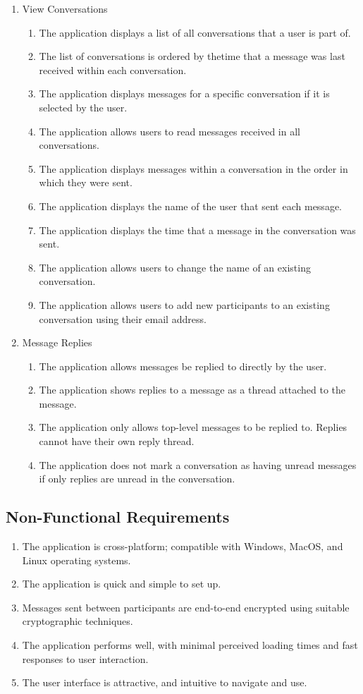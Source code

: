 \begin{enumerate}
  \item View Conversations
  \begin{enumerate}
    \item The application displays a list of all conversations that a user is part of.
    \item The list of conversations is ordered by thetime that a message was last received within each conversation.
    \item The application displays messages for a specific conversation if it is selected by the user.
    \item The application allows users to read messages received in all conversations.
    \item The application displays messages within a conversation in the order in which they were sent.
    \item The application displays the name of the user that sent each message.
    \item The application displays the time that a message in the conversation was sent.
    \item The application allows users to change the name of an existing conversation.
    \item The application allows users to add new participants to an existing conversation using their email address.
  \end{enumerate}

  \item Message Replies
  \begin{enumerate}
    \item The application allows messages be replied to directly by the user.
    \item The application shows replies to a message as a thread attached to the message.
    \item The application only allows top-level messages to be replied to. Replies cannot have their own reply thread.
    \item The application does not mark a conversation as having unread messages if only replies are unread in the conversation.
  \end{enumerate}
\end{enumerate}

\subsection{Non-Functional Requirements}
\begin{enumerate}
  \item The application is cross-platform; compatible with Windows, MacOS, and Linux operating systems.
  \item The application is quick and simple to set up.
  \item Messages sent between participants are end-to-end encrypted using suitable cryptographic techniques.
  \item The application performs well, with minimal perceived loading times and fast responses to user interaction.
  \item The user interface is attractive, and intuitive to navigate and use.
\end{enumerate}

